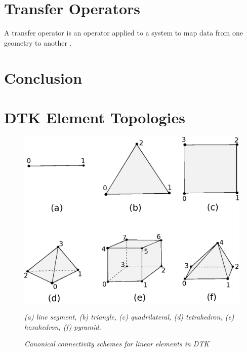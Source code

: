 \documentclass[letterpaper,12pt]{article}
\begin{document}
\clearpage

\section{Transfer Operators}\label{sec:transfer}
A transfer operator is an operator applied to a system to map data
from one geometry to another \cite{LIME_2011}.

\clearpage

\section{Conclusion}\label{sec:conc}

\clearpage

\appendix
\section{DTK Element Topologies}\label{apdx:cell_topo}

\begin{figure}[htpb!]
  \centering
  \includegraphics[width=5.5in]{Linear_Elements.eps}
  \caption{\sl Canonical connectivity schemes for linear elements in
    DTK}{\sl (a) line segment, (b) triangle, (c) quadrilateral, (d)
    tetrahedron, (e) hexahedron, (f) pyramid.}
  \label{fig:linear_elements}
\end{figure}

\pagebreak


\end{document}
